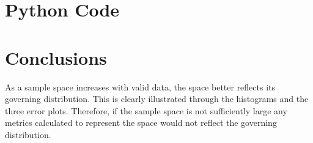\section{Python Code} 



\section{Conclusions} 
As a sample space increases with valid data, the space better reflects its governing distribution. This is clearly illustrated through the histograms and the three error plots. Therefore, if the sample space is not sufficiently large any metrics calculated to represent the space would not reflect the governing distribution.  

